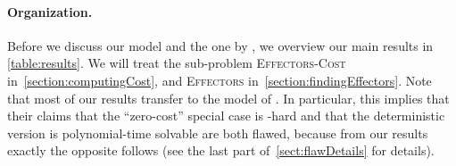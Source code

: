 \documentclass{article}
\newcommand{\mytabref}[1]{\autoref{#1}}
\newcommand{\probEffectors}{\textsc{Effectors}\xspace}
\begin{document}
\paragraph{Organization.}
Before we discuss our model and the one by \citet{LTGMH10}, 
we overview our main results in \autoref{table:results}.
We will treat the sub-problem \textsc{Eff\-ectors-Cost}
in~\autoref{section:computingCost},
and \probEffectors in~\autoref{section:findingEffectors}.
Note that most of our results transfer to the model of \citet{LTGMH10}.
In particular, this implies that their claims that the ``zero-cost'' 
special case is -hard \cite[Lemma~1]{LTGMH10} and that the deterministic version is polynomial-time solvable
are both flawed, because from our results exactly the opposite follows
(see the last part of~\autoref{sect:flawDetails} for details).

  \newcommand{\with}[1]{ {\scriptsize wrt.~}}
  \newcommand{\see}[1]{ {\scriptsize \mytabref{#1}}}
  \newcommand{\seecite}[1]{ {\scriptsize \cite{#1}}}
  \newcommand{\clippedPath}[2][] {
    \begin{scope}
      \clip #2;
      \draw[#1] #2;
    \end{scope}
    \draw[white, line width=1pt] #2;
  }
  
  \newcommand{\resultBox}[2]{    
    \clippedPath[line width=4pt, #1!75!black, fill= #1!5]{#2}    
  }
  
  \newcommand{\titleBox}[1][1]{    
    \clippedPath[line width=3pt, black ]{(-1.4,0) -- (-1.4,#1) -- (0,#1) -- (0,0) --cycle }        
  } 
  \newcommand{\titleNode}[2][0.5]{    
    \node[rectangle,align=center] () at (-0.7,#1) {#2};    
  }  
  
\end{document}

